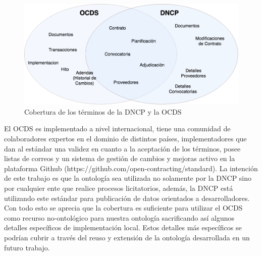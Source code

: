     \begin{figure}[h!]
    \centering
    \includegraphics[width=150mm]{figuras/Diagramas-VennCobertura}
    \caption{Cobertura de los términos de la DNCP y la OCDS}
    \label{img:cobertura de la ontologia }
    \end{figure}

El OCDS es implementado a nivel internacional, tiene una comunidad de colaboradores expertos en el dominio de distintos países, implementadores que dan al estándar una validez en cuanto a la aceptación de los términos, posee listas de correos y un sistema de gestión de cambios y mejoras activo en la plataforma Github (https://github.com/open-contracting/standard). La intención de este trabajo es que la ontología sea utilizada no solamente por la DNCP sino por cualquier ente que realice procesos licitatorios, además, la DNCP está utilizando este estándar para publicación de datos orientados a desarrolladores. Con todo esto se aprecia que la cobertura es suficiente para utilizar el OCDS como recurso no-ontológico para nuestra ontología sacrificando así algunos detalles específicos de implementación local. Estos detalles más específicos se podrían cubrir a través del reuso y extensión de la ontología desarrollada en un futuro trabajo.
